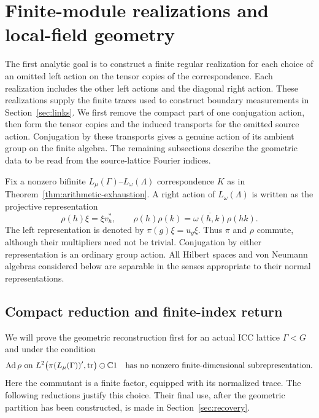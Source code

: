 \section{Finite-module realizations and local-field geometry}
\label{sec:setup}

The first analytic goal is to construct a finite regular realization
for each choice of an omitted left action on the tensor copies of the
correspondence. Each realization includes the other left actions and
the diagonal right action. These realizations supply the finite traces
used to construct boundary measurements in Section~\ref{sec:links}.
We first remove the compact part of one conjugation action, then form
the tensor copies and the induced transports for the omitted source
action. Conjugation by these transports gives a genuine action of its
ambient group on the finite algebra. The remaining subsections describe
the geometric data to be read from the source-lattice Fourier indices.

Fix a nonzero
bifinite $L_\mu(\Gamma)$--$L_\omega(\Lambda)$ correspondence $K$ as in
Theorem~\ref{thm:arithmetic-exhaustion}. A right action
of $L_\omega(\Lambda)$ is written as the projective representation
\[
 \rho(h)\xi=\xi v_h^*,\qquad
 \rho(h)\rho(k)=\overline{\omega(h,k)}\rho(hk).
\]
The left representation is denoted by $\pi(g)\xi=u_g\xi$.  Thus $\pi$
and $\rho$ commute, although their multipliers need not be trivial.
Conjugation by either representation is an ordinary group action.
All Hilbert spaces and von Neumann algebras considered below are
separable in the senses appropriate to their normal representations.


\subsection{Compact reduction and finite-index return}

We will prove the geometric reconstruction first for an actual ICC
lattice $\Gamma<G$ and under the condition
\begin{equation}
 \operatorname{Ad}\rho\ \text{on}\
 L^2\bigl(\pi(L_\mu(\Gamma))',\operatorname{tr}\bigr)
       \ominus\mathbb C1
 \quad\text{has no nonzero finite-dimensional subrepresentation}.
 \label{eq:setup-weak-mixing}
\end{equation}
Here the commutant is a finite factor, equipped with its normalized
trace.  The following reductions justify this choice.  Their final use,
after the geometric partition has been constructed, is made in
Section~\ref{sec:recovery}.

